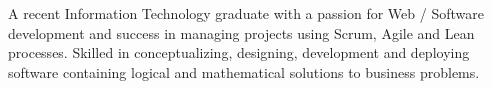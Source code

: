\documentclass[letter,10pt]{article}
\begin{document}


A recent Information Technology graduate with a passion for Web / Software development and success in managing projects using Scrum, Agile and Lean processes. Skilled in conceptualizing, designing, development and deploying software containing logical and mathematical solutions to business problems.
\end{document}
